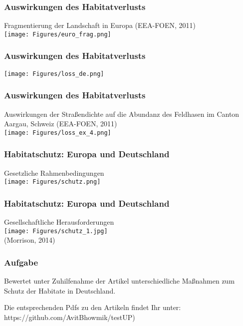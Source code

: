 \documentclass{beamer}
\begin{document}

\begin{frame}
\frametitle{Auswirkungen des Habitatverlusts}
\hspace{-0.3cm} Fragmentierung der Landschaft in Europa (EEA-FOEN, 2011)\\[0.3cm]
\centering
\texttt{[image: Figures/euro\_frag.png]} 
\end{frame}


\begin{frame}
\frametitle{Auswirkungen des Habitatverlusts}
\centering
\texttt{[image: Figures/loss\_de.png]} 
\end{frame}


\begin{frame}
\frametitle{Auswirkungen des Habitatverlusts}
Auswirkungen der Straßendichte auf die Abundanz des Feldhasen im Canton Aargau, Schweiz (EEA-FOEN, 2011)\\[0.3cm]
\centering
\texttt{[image: Figures/loss\_ex\_4.png]} 
\end{frame}


\begin{frame}
\frametitle{Habitatschutz: Europa und Deutschland}
Gesetzliche Rahmenbedingungen\\
\centering
\texttt{[image: Figures/schutz.png]}
\end{frame}


\begin{frame}
\frametitle{Habitatschutz: Europa und Deutschland}
Gesellschaftliche Herausforderungen\\
\centering
\texttt{[image: Figures/schutz\_1.jpg]}\\
\tiny (Morrison, 2014)
\end{frame}


\begin{frame}
\frametitle{\LARGE\alert{Aufgabe}}
Bewertet unter Zuhilfenahme der Artikel unterschiedliche Maßnahmen zum Schutz der Habitate in Deutschland.

Die entsprechenden Pdfs zu den Artikeln findet Ihr unter: \alert{https://github.com/AvitBhowmik/testUP})

\end{frame}
\end{document}

